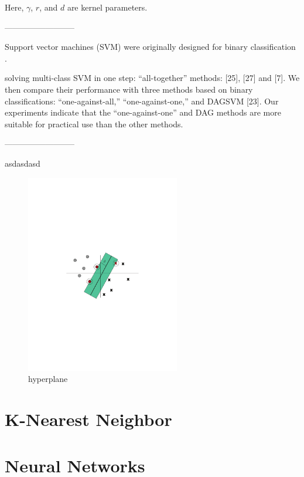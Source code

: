 Here, $\gamma$, $r$, and $d$ are kernel parameters.

--------------------------

Support vector machines (SVM) were originally designed for binary classification \cite{hsu2002comparison}.

solving multi-class SVM in one step: “all-together” methods: [25], [27] and [7]. We then compare their performance with three methods based on binary classifications: “one-against-all,” “one-against-one,” and DAGSVM [23]. Our experiments indicate that the “one-against-one” and DAG methods are more suitable for practical use than the other methods. 

--------------------------

asdasdasd \cite{berwick2003idiot}

\begin{figure}[!htp]
  \center
  \includegraphics[width=0.6\textwidth]{figures/hyperplane}
  \caption{hyperplane}
  \label{fig:hyperplane}
\end{figure}

\section{K-Nearest Neighbor}

\section{Neural Networks}
